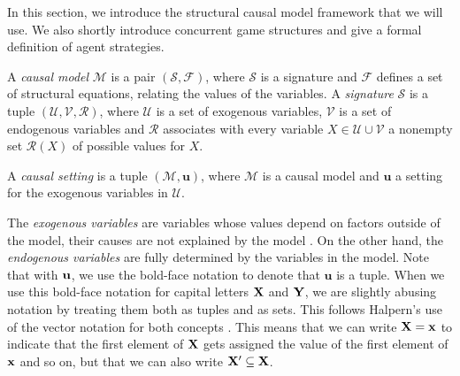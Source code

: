In this section, we introduce the structural causal model framework that we will use. We also shortly introduce concurrent game structures and give a formal definition of agent strategies. 

\begin{definition} \label{def:causal model}
    A \emph{causal model} $\mathcal{M}$ is a pair $(\mathcal{S},\mathcal{F})$, where $\mathcal{S}$ is a signature and $\mathcal{F}$ defines a set of structural equations, relating the values of the variables.
    A \emph{signature} $\mathcal{S}$ is a tuple $(\mathcal{U},\mathcal{V},\mathcal{R})$, where $\mathcal{U}$ is a set of exogenous variables, $\mathcal{V}$ is a set of endogenous variables and $\mathcal{R}$ associates with every variable $X\in \mathcal{U}\cup \mathcal{V}$ a nonempty set $\mathcal{R}(X)$ of possible values for $X$.
    
    A \emph{causal setting} is a tuple $(\mathcal{M},\mathbf{u})$, where $\mathcal{M}$ is a causal model and $\mathbf{u}$ a setting for the exogenous variables in $\mathcal{U}$.
\end{definition}

The \emph{exogenous variables} are variables whose values depend on factors outside of the model, their causes are not explained by the model \cite{halpern2016actual,Pearl2016causal}.
On the other hand, the \emph{endogenous variables} are fully determined by the variables in the model. 
Note that with $\mathbf{u}$, we use the bold-face notation to denote that $\mathbf{u}$ is a tuple.
When we use this bold-face notation for capital letters $\mathbf{X}$ and $\mathbf{Y}$, we are slightly abusing notation by treating them both as tuples and as sets. This follows Halpern's use of the vector notation for both concepts \cite{halpern2016actual}.
This means that we can write $\mathbf{X} = \mathbf{x}$ to indicate that the first element of $\mathbf{X}$ gets assigned the value of the first element of $\mathbf{x}$ and so on, but that we can also write $\mathbf{X}'\subseteq \mathbf{X}$.

